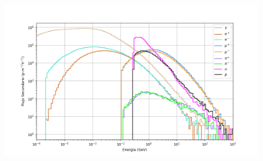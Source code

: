 \begin{frame}{}
\begin{columns}
\begin{column}{0.5\textwidth}
                \vspace*{-0.3cm} %
                \begin{figure}
                    \centering
				    \includegraphics[width=1.13\textwidth]{Figures/Thesis_flux_new2_4600msnm_without_title.png}
                \end{figure}            
            \end{column}
        \end{columns}
    \end{frame}  

